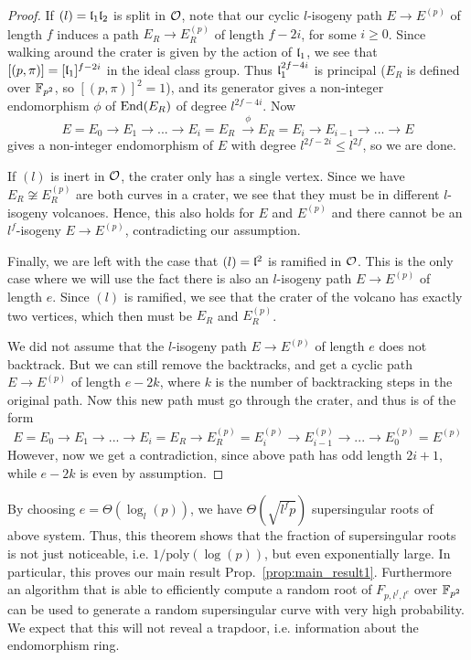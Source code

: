 \begin{proof}
    If $(l) = \mathfrak{l}_1 \mathfrak{l}_2$ is split in $\mathcal{O}$, note that our cyclic $l$-isogeny path $E \to E^{(p)}$ of length $f$ induces a path $E_R \to E_R^{(p)}$ of length $f - 2i$, for some $i \geq 0$.
    Since walking around the crater is given by the action of $\mathfrak{l}_1$, we see that $[(p, \pi)] = [\mathfrak{l}_1]^{f - 2i}$ in the ideal class group.
    Thus $\mathfrak{l}_1^{2f - 4i}$ is principal ($E_R$ is defined over $\mathbb{F}_{p^2}$, so $[(p, \pi)]^2 = 1$), and its generator gives a non-integer endomorphism $\phi$ of $\mathrm{End}(E_R)$ of degree $l^{2f - 4i}$.
    Now
    \begin{equation*}
        E = E_0 \to E_1 \to ... \to E_i = E_R \ \overset{\phi}{\longrightarrow} E_R = E_i \to E_{i - 1} \to ... \to E
    \end{equation*}
    gives a non-integer endomorphism of $E$ with degree $l^{2f - 2i} \leq l^{2f}$, so we are done.

    If $(l)$ is inert in $\mathcal{O}$, the crater only has a single vertex.
    Since we have $E_R \not\cong E_R^{(p)}$ are both curves in a crater, we see that they must be in different $l$-isogeny volcanoes.
    Hence, this also holds for $E$ and $E^{(p)}$ and there cannot be an $l^f$-isogeny $E \to E^{(p)}$, contradicting our assumption.

    Finally, we are left with the case that $(l) = \mathfrak{l}^2$ is ramified in $\mathcal{O}$.
    This is the only case where we will use the fact there is also an $l$-isogeny path $E \to E^{(p)}$ of length $e$.
    Since $(l)$ is ramified, we see that the crater of the volcano has exactly two vertices, which then must be $E_R$ and $E_R^{(p)}$.

    We did not assume that the $l$-isogeny path $E \to E^{(p)}$ of length $e$ does not backtrack.
    But we can still remove the backtracks, and get a cyclic path $E \to E^{(p)}$ of length $e - 2k$, where $k$ is the number of backtracking steps in the original path.
    Now this new path must go through the crater, and thus is of the form
    \begin{equation*}
        E = E_0 \to E_1 \to ... \to E_i = E_R \to E_R^{(p)} = E_i^{(p)} \to E_{i - 1}^{(p)} \to ... \to E_0^{(p)} = E^{(p)}
    \end{equation*}
    However, now we get a contradiction, since above path has odd length $2i + 1$, while $e - 2k$ is even by assumption.
\end{proof}
By choosing $e = \Theta(\log_l(p))$, we have $\Theta(\sqrt{l^fp})$ supersingular roots of above system.
Thus, this theorem shows that the fraction of supersingular roots is not just noticeable, i.e. $1/\mathrm{poly}(\log(p))$, but even exponentially large.
In particular, this proves our main result Prop.~\ref{prop:main_result1}.
Furthermore an algorithm that is able to efficiently compute a random root of $F_{p, l^f, l^e}$ over $\mathbb{F}_{p^2}$ can be used to generate a random supersingular curve with very high probability.
We expect that this will not reveal a trapdoor, i.e. information about the endomorphism ring.

